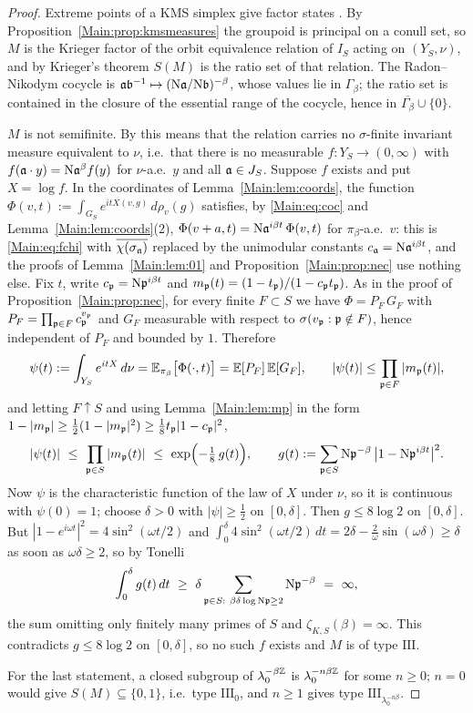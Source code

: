 \begin{proof}
Extreme points of a KMS simplex give factor states \cite[\S5.3]{BR}. By
Proposition~\ref{Main:prop:kmsmeasures} the groupoid is principal on a conull set, so $M$ is
the Krieger factor of the orbit equivalence relation of $I_S$ acting on $(Y_S,\nu)$, and by
Krieger's theorem \cite{Krieger} $S(M)$ is the ratio set of that relation. The Radon--Nikodym cocycle is
$\mathfrak{a}\mathfrak{b}^{-1}\mapsto(\mathrm{N}\mathfrak{a}/\mathrm{N}\mathfrak{b})^{-\beta}$, whose values lie in $\Gamma_\beta$; the
ratio set is contained in the closure of the essential range of the cocycle, hence in
$\overline{\Gamma_\beta}\cup\{0\}$.

$M$ is not semifinite. By \cite{Krieger} this means that the relation carries no
$\sigma$-finite invariant measure equivalent to $\nu$, i.e.\ that there is no measurable
$f:Y_S\to(0,\infty)$ with $f(\mathfrak{a}\cdot y)=\mathrm{N}\mathfrak{a}^{\beta}f(y)$ for $\nu$-a.e.\ $y$ and all
$\mathfrak{a}\in J_S$. Suppose $f$ exists and put $X=\log f$. In the coordinates of
Lemma~\ref{Main:lem:coords}, the function
$\Phi(v,t):=\int_{G_S}e^{itX(v,g)}\,d\rho_v(g)$ satisfies, by \eqref{Main:eq:coc} and
Lemma~\ref{Main:lem:coords}(2), $\Phi(v+a,t)=\mathrm{N}\mathfrak{a}^{i\beta t}\,\Phi(v,t)$ for $\pi_\beta$-a.e.\ $v$:
this is \eqref{Main:eq:fchi} with $\overline{\chi(\sigma_{\mathfrak{a}})}$ replaced by the unimodular
constants $c_{\mathfrak{a}}=\mathrm{N}\mathfrak{a}^{i\beta t}$, and the proofs of Lemma~\ref{Main:lem:01} and
Proposition~\ref{Main:prop:nec} use nothing else. Fix $t$, write $c_{\mathfrak{p}}=\mathrm{N}\mathfrak{p}^{i\beta t}$ and
$m_{\mathfrak{p}}(t)=(1-t_{\mathfrak{p}})/(1-c_{\mathfrak{p}} t_{\mathfrak{p}})$. As in the proof of Proposition~\ref{Main:prop:nec}, for
every finite $F\subset S$ we have $\Phi=P_F\,G_F$ with $P_F=\prod_{\mathfrak{p}\in F}c_{\mathfrak{p}}^{v_{\mathfrak{p}}}$ and
$G_F$ measurable with respect to $\sigma(v_{\mathfrak{p}}:\mathfrak{p}\notin F)$, hence independent of $P_F$ and
bounded by $1$. Therefore
\[
\psi(t):=\int_{Y_S}e^{itX}\,d\nu=\mathbb{E}_{\pi_\beta}\bigl[\Phi(\cdot,t)\bigr]=\mathbb{E}[P_F]\,\mathbb{E}[G_F],
\qquad |\psi(t)|\le\prod_{\mathfrak{p}\in F}|m_{\mathfrak{p}}(t)|,
\]
and letting $F\uparrow S$ and using Lemma~\ref{Main:lem:mp} in the form
$1-|m_{\mathfrak{p}}|\ge\frac12(1-|m_{\mathfrak{p}}|^2)\ge\frac18t_{\mathfrak{p}}|1-c_{\mathfrak{p}}|^2$,
\[
|\psi(t)|\ \le\ \prod_{\pp\in S}|m_\pp(t)|\ \le\ \exp\Bigl(-\tfrac18\,g(t)\Bigr),\qquad
g(t):=\sum_{\pp\in S}\Ns\pp^{-\beta}\,\bigl|1-\Ns\pp^{i\beta t}\bigr|^2 .
\]
Now $\psi$ is the characteristic function of the law of $X$ under $\nu$, so it is continuous
with $\psi(0)=1$; choose $\delta>0$ with $|\psi|\ge\frac12$ on $[0,\delta]$. Then
$g\le8\log2$ on $[0,\delta]$. But $|1-e^{i\omega t}|^2=4\sin^2(\omega t/2)$ and
$\int_0^\delta4\sin^2(\omega t/2)\,dt=2\delta-\frac2\omega\sin(\omega\delta)\ge\delta$ as
soon as $\omega\delta\ge2$, so by Tonelli
\[
\int_0^\delta g(t)\,dt\ \ge\ \delta\sum_{\pp\in S:\ \beta\delta\log\Ns\pp\ge2}\Ns\pp^{-\beta}
\ =\ \infty,
\]
the sum omitting only finitely many primes of $S$ and $\zeta_{K,S}(\beta)=\infty$. This
contradicts $g\le8\log2$ on $[0,\delta]$, so no such $f$ exists and $M$ is of type
$\mathrm{III}$.

For the last statement, a closed subgroup of $\lambda_0^{-\beta\mathbb{Z}}$ is $\lambda_0^{-n\beta\mathbb{Z}}$
for some $n\ge0$; $n=0$ would give $S(M)\subseteq\{0,1\}$, i.e.\ type $\mathrm{III}_0$, and
$n\ge1$ gives type $\mathrm{III}_{\lambda_0^{-n\beta}}$.
\end{proof}

